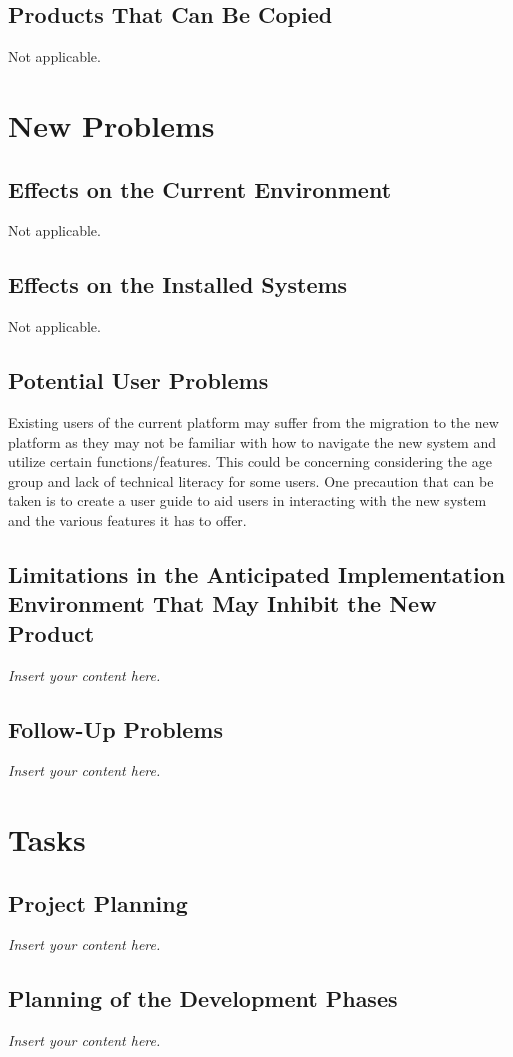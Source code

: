 \documentclass[12pt]{article}
\newcommand{\lips}{\textit{Insert your content here.}}
\begin{document}
\subsection{Products That Can Be Copied}
Not applicable.

\section{New Problems}
\subsection{Effects on the Current Environment}
Not applicable.
\subsection{Effects on the Installed Systems}
Not applicable.
\subsection{Potential User Problems}

Existing users of the current platform may suffer from the migration
to the new platform as they may not be familiar with how to navigate
the new system and utilize certain functions/features. This could be
concerning considering the age group and lack of technical literacy
for some users. One precaution that can be taken is to create a user
guide to aid users in interacting with the new system and the various
features it has to offer.

\subsection{Limitations in the Anticipated Implementation Environment That May
Inhibit the New Product}
\lips
\subsection{Follow-Up Problems}
\lips

\section{Tasks}
\subsection{Project Planning}
\lips
\subsection{Planning of the Development Phases}
\lips
\end{document}
